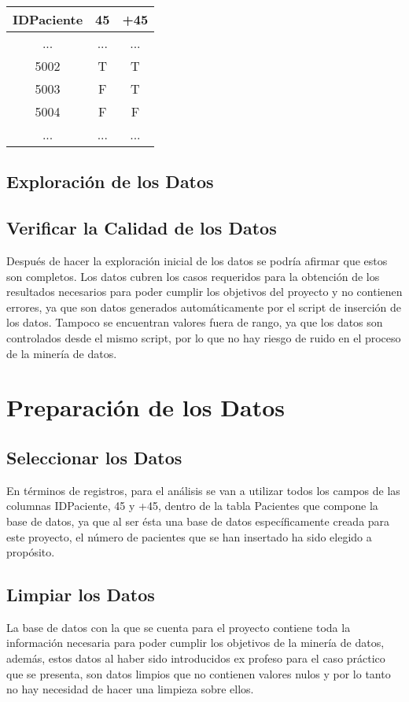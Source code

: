 \documentclass{article}
\begin{document}
\begin{center}
	\begin{tabular}{ |c|c|c| } 
		\hline
		IDPaciente & 45 & +45 \\
		\hline
		... & ... & ... \\ 
		5002 & T & T\\ 
		5003 & F & T\\ 
		5004 & F & F\\
		... & ... & ... \\ 
		\hline
\end{tabular}
\end{center}

\subsection{Exploración de los Datos}

\subsection{Verificar la Calidad de los Datos}
Después de hacer la exploración inicial de los datos se podría afirmar que estos son completos. Los datos cubren los casos requeridos para la obtención de los resultados necesarios para poder cumplir los objetivos del proyecto y no contienen errores, ya que son datos generados automáticamente por el script de inserción de los datos. Tampoco se encuentran valores fuera de rango, ya que los datos son controlados desde el mismo script, por lo que no hay riesgo de ruido en el proceso de la minería de datos.

\section{Preparación de los Datos}

\subsection{Seleccionar los Datos}
En términos de registros, para el análisis se van a utilizar todos los campos de las columnas IDPaciente, 45 y +45, dentro de la tabla Pacientes que compone la base de datos, ya que al ser ésta una base de datos específicamente creada para este proyecto, el número de pacientes que se han insertado ha sido elegido a propósito. 

\subsection{Limpiar los Datos}
La base de datos con la que se cuenta para el proyecto contiene toda la información necesaria para poder cumplir los objetivos de la minería de datos, además, estos datos al haber sido introducidos ex profeso para el caso práctico que se presenta, son datos limpios que no contienen valores nulos y por lo tanto no hay necesidad de hacer una limpieza sobre ellos.
\end{document}
